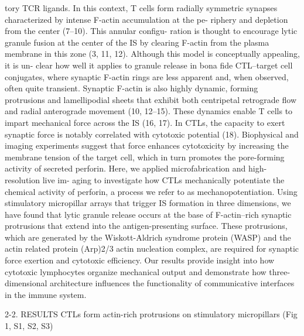 tory TCR ligands. In this context, T cells form radially symmetric synapses characterized by intense F-actin accumulation at the pe- riphery and depletion from the center (7–10). This annular configu- ration is thought to encourage lytic granule fusion at the center of the IS by clearing F-actin from the plasma membrane in this zone (3, 11, 12). Although this model is conceptually appealing, it is un- clear how well it applies to granule release in bona fide CTL–target cell conjugates, where synaptic F-actin rings are less apparent and, when observed, often quite transient. Synaptic F-actin is also highly dynamic, forming protrusions and lamellipodial sheets that exhibit both centripetal retrograde flow and radial anterograde movement (10, 12–15). These dynamics enable T cells to impart mechanical force across the IS (16, 17). In CTLs, the capacity to exert synaptic force is notably correlated with cytotoxic potential (18). Biophysical and imaging experiments suggest that force enhances cytotoxicity by increasing the membrane tension of the target cell, which in turn promotes the pore-forming activity of secreted perforin. Here, we applied microfabrication and high-resolution live im- aging to investigate how CTLs mechanically potentiate the chemical activity of perforin, a process we refer to as mechanopotentiation. Using stimulatory micropillar arrays that trigger IS formation in three dimensions, we have found that lytic granule release occurs at the base of F-actin–rich synaptic protrusions that extend into the antigen-presenting surface. These protrusions, which are generated by the Wiskott-Aldrich syndrome protein (WASP) and the actin related protein (Arp)2/3 actin nucleation complex, are required for synaptic force exertion and cytotoxic efficiency. Our results provide insight into how cytotoxic lymphocytes organize mechanical output and demonstrate how three-dimensional architecture influences the functionality of communicative interfaces in the immune system.

2-2. RESULTS
CTLs form actin-rich protrusions on stimulatory micropillars (Fig 1, S1, S2, S3)

